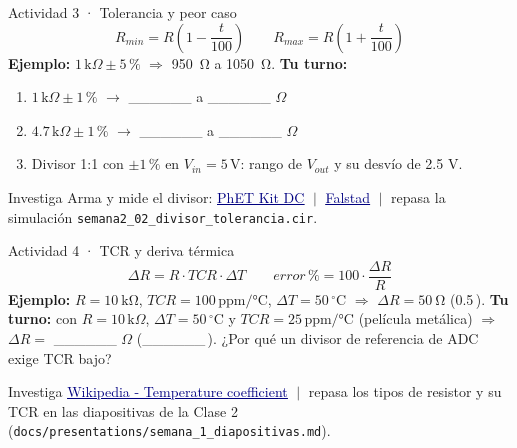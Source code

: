 \documentclass[aspectratio=169]{beamer}
\newcommand{\enlace}[2]{\href{#1}{\textcolor{navy}{\underline{#2}}}}
\begin{document}
\begin{frame}{Actividad 3 · Tolerancia y peor caso}
  \[
    R_{min} = R\left(1-\frac{t}{100}\right)
    \qquad
    R_{max} = R\left(1+\frac{t}{100}\right)
  \]
  \textbf{Ejemplo:} $1\,\text{k}\Omega \pm 5\,\text{\%}$ $\Rightarrow$ \SI{950}{\ohm} a \SI{1050}{\ohm}.
  \pause
  \vspace{0.4em}
  \textbf{Tu turno:}
  \begin{enumerate}
    \item $1\,\text{k}\Omega \pm 1\,\text{\%}$ $\rightarrow$ \_\_\_\_\_\_ a \_\_\_\_\_\_ $\Omega$
    \item $4.7\,\text{k}\Omega \pm 1\,\text{\%}$ $\rightarrow$ \_\_\_\_\_\_ a \_\_\_\_\_\_ $\Omega$
    \item Divisor 1:1 con $\pm1\,\text{\%}$ en $V_{in}=5\,\text{V}$: rango de $V_{out}$ y su desvío de 2.5 V.
  \end{enumerate}
  \pause
  \begin{block}{Investiga}
    \small
    Arma y mide el divisor: \enlace{https://phet.colorado.edu/sims/html/circuit-construction-kit-dc/latest/circuit-construction-kit-dc_en.html}{PhET Kit DC}
    $\;|\;$ \enlace{https://www.falstad.com/circuit/}{Falstad}
    $\;|\;$ repasa la simulación \texttt{semana2\_02\_divisor\_tolerancia.cir}.
  \end{block}
\end{frame}

\begin{frame}{Actividad 4 · TCR y deriva térmica}
  \[
    \Delta R = R\cdot TCR\cdot \Delta T
    \qquad
    error\,\text{\%} = 100\cdot\frac{\Delta R}{R}
  \]
  \textbf{Ejemplo:} $R=\SI{10}{\kilo\ohm}$, $TCR=100\,\text{ppm/°C}$, $\Delta T = 50\,^\circ\text{C}$
  $\Rightarrow$ $\Delta R = \SI{50}{\ohm}$ (0.5\,\text{\%}).
  \pause
  \vspace{0.4em}
  \textbf{Tu turno:} con $R = 10\,\text{k}\Omega$, $\Delta T = 50\,^\circ\text{C}$ y
  $TCR = 25\,\text{ppm/°C}$ (película metálica) $\Rightarrow$
  $\Delta R =$ \_\_\_\_\_\_ $\Omega$ (\_\_\_\_\_\_\,\text{\%}). ¿Por qué un divisor de referencia de ADC exige TCR bajo?

  \pause
  \begin{block}{Investiga}
    \small
    \enlace{https://en.wikipedia.org/wiki/Temperature_coefficient}{Wikipedia - Temperature coefficient}
    $\;|\;$ repasa los tipos de resistor y su TCR en las diapositivas de la Clase 2
    (\texttt{docs/presentations/semana\_1\_diapositivas.md}).
  \end{block}
\end{frame}
\end{document}

